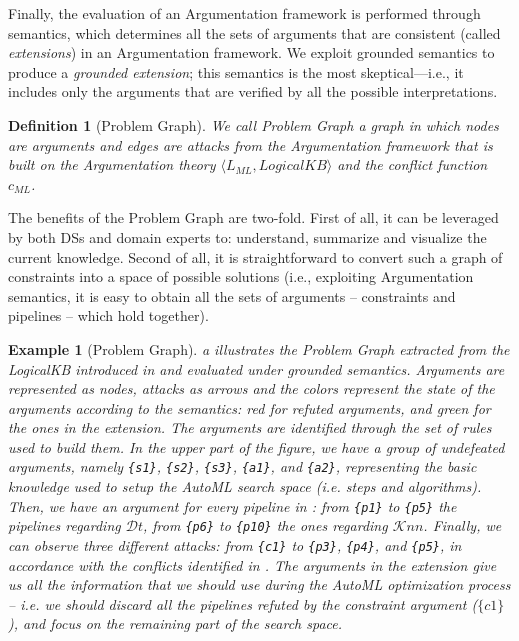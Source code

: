 \documentclass[5p,times]{elsarticle}
\newtheorem{example}{Example}
\newtheorem{definition}{Definition}
\begin{document}
Finally, the evaluation of an Argumentation framework is performed through semantics, which determines all the sets of arguments that are consistent (called \emph{extensions}) in an Argumentation framework.
We exploit grounded semantics \cite{Dung1995abstractArg} to produce a \emph{grounded extension}; this semantics is the most skeptical---i.e., it includes only the arguments that are verified by all the possible interpretations. %

\begin{definition}[Problem Graph]
We call \emph{Problem Graph} a graph in which nodes are arguments and edges are attacks from the Argumentation framework that is built on the Argumentation theory $\langle L_{ML}, LogicalKB \rangle$ and the conflict function $c_{ML}$.
\end{definition}

The benefits of the Problem Graph are two-fold.
First of all, it can be leveraged by both DSs and domain experts to: understand, summarize and visualize the current knowledge.
Second of all, it is straightforward to convert such a graph of constraints into a space of possible solutions (i.e., exploiting Argumentation semantics, it is easy to obtain all the sets of arguments -- constraints and pipelines -- which hold together).

\begin{example}[Problem Graph]
a illustrates the Problem Graph extracted from the LogicalKB introduced in  and evaluated under grounded semantics.
Arguments are represented as nodes, attacks as arrows and the colors represent the state of the arguments according to the semantics: red for refuted arguments, and green for the ones in the extension.
The arguments are identified through the set of rules used to build them.
In the upper part of the figure, we have a group of undefeated arguments, namely \texttt{\{s1\}}, \texttt{\{s2\}}, \texttt{\{s3\}}, \texttt{\{a1\}}, and \texttt{\{a2\}}, representing the basic knowledge used to setup the AutoML search space (i.e. steps and algorithms).
Then, we have an argument for every pipeline in : from \texttt{\{p1\}} to \texttt{\{p5\}} the pipelines regarding $\mathcal{D}t$, from \texttt{\{p6\}} to \texttt{\{p10\}} the ones regarding $\mathcal{K}nn$.
Finally, we can observe three different attacks: from \texttt{\{c1\}} to \texttt{\{p3\}}, \texttt{\{p4\}}, and \texttt{\{p5\}}, in accordance with the conflicts identified in .
The arguments in the extension give us all the information that we should use during the AutoML optimization process -- i.e. we should discard all the pipelines refuted by the constraint argument ($\{c1\}$), and focus on the remaining part of the search space.
\label{ex:graph}
\end{example}
\end{document}

